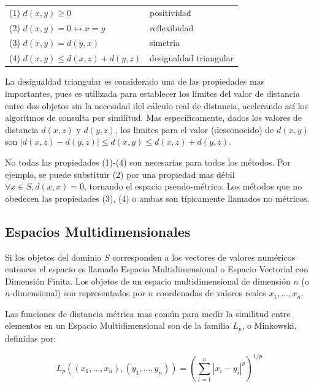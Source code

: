 \begin{tabular}{ l l }
  (1) $d(x, y) \geq 0   $ & positividad\\
  (2) $d(x, y) = 0 \leftrightarrow x = y$ & reflexibidad\\
  (3) $d(x, y) = d(y, x)$ & simetria\\
  (4) $d(x, y) \leq d(x, z) + d(y, z)$ & desigualdad triangular\\
\end{tabular}
\vspace{0.5cm}

La desigualdad triangular es considerado una de las propiedades mas importantes, pues es utilizada para establecer los límites del valor de distancia entre dos objetos sin la necesidad del cálculo real de distancia, acelerando así los algoritmos de consulta por similitud. Mas específicamente, dados los valores de distancia $d(x,z)$ y $d(y, z)$, los limites para el valor (desconocido) de $d(x, y)$ son $|d(x,z) - d(y, z)| \leq d(x, y) \leq d(x,z) + d(y, z)$.

No todas las propiedades (1)-(4) son necesarias para todos los métodos. Por ejemplo, se puede substituir (2) por una propiedad mas débil $\forall x \in S, d(x,x) = 0$, tornando el espacio pseudo-métrico. Los métodos que no obedecen las propiedades (3), (4) o ambas son típicamente llamados no métricos.


\subsection{Espacios Multidimensionales}

Si los objetos del dominio $S$ corresponden a los vectores de valores numéricos entonces el espacio es llamado Espacio Multidimensional o Espacio Vectorial con Dimensión Finita. Los objetos de un espacio multidimensional de dimensión $n$ (o $n$-dimensional) son representados por $n$ coordenadas de valores reales ${x_1, ..., x_n}$.

Las funciones de distancia métrica mas común para medir la similitud entre elementos en un Espacio Multidimensional son de la familia $L_p$, o Minkowski, definidas por:

\begin{equation}\label{lpnorm}
 L_p ((x_1,...,x_n), (y_1,...,y_n)) = (\sum_{i=1}^{n} |x_i - y_i|^p)^{1/p}
\end{equation}

